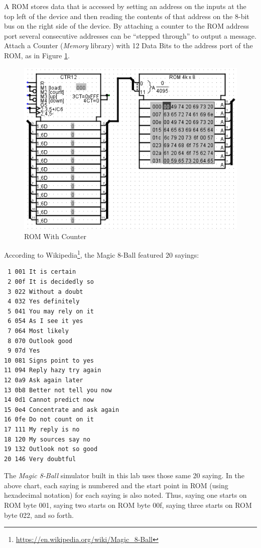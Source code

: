 A ROM stores data that is accessed by setting an address on the inputs at the top left of the device and then reading the contents of that address on the 8-bit bus on the right side of the device. By attaching a counter to the ROM address port several consecutive addresses can be ``stepped through'' to output a message. Attach a Counter (\textit{Memory} library) with 12 Data Bits to the address port of the ROM, as in Figure \ref{fig:rom-03}.

\begin{figure}[H]
	\centering
	\includegraphics[width=\maxwidth{.95\linewidth}]{gfx/rom-03}
	\caption{ROM With Counter}
	\label{fig:rom-03}
\end{figure}

According to Wikipedia\footnote{\url{https://en.wikipedia.org/wiki/Magic_8-Ball}}, the Magic 8-Ball featured 20 sayings: 

\begin{verbatim}
 1 001 It is certain
 2 00f It is decidedly so
 3 022 Without a doubt
 4 032 Yes definitely
 5 041 You may rely on it
 6 054 As I see it yes
 7 064 Most likely
 8 070 Outlook good
 9 07d Yes
10 081 Signs point to yes
11 094 Reply hazy try again
12 0a9 Ask again later
13 0b8 Better not tell you now
14 0d1 Cannot predict now
15 0e4 Concentrate and ask again
16 0fe Do not count on it
17 111 My reply is no
18 120 My sources say no
19 132 Outlook not so good
20 146 Very doubtful
\end{verbatim}

The \textit{Magic 8-Ball} simulator built in this lab uses those same 20 saying. In the above chart, each saying is numbered and the start point in ROM (using hexadecimal notation) for each saying is also noted. Thus, saying one starts on ROM byte 001, saying two starts on ROM byte 00f, saying three starts on ROM byte 022, and so forth.

